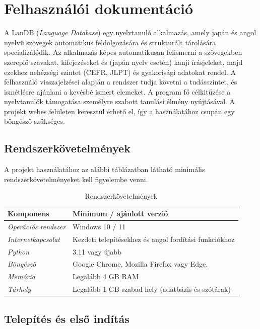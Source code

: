 \chapter{Felhasználói dokumentáció}
\label{ch:user}
A LanDB (\textit{Language Database}) egy nyelvtanuló alkalmazás, amely japán és angol nyelvű szövegek automatikus feldolgozására és strukturált tárolására specializálódik. Az alkalmazás képes automatikusan felismerni a szövegekben szereplő szavakat, kifejezéseket és (japán nyelv esetén) kanji írásjeleket, majd ezekhez nehézségi szintet (CEFR, JLPT) és gyakorisági adatokat rendel. A felhasználó visszajelzései alapján a rendszer tudja követni a tudásszintet, és ismétlésre ajánlani a kevésbé ismert elemeket. A program fő célkitűzése a nyelvtanulók támogatása személyre szabott tanulási élmény nyújtásával. A projekt webes felületen keresztül érhető el, így a használatához csupán egy böngésző szükséges.

\section{Rendszerkövetelmények}

A projekt használatához az alábbi táblázatban látható minimális rendszerkövetelményeket kell figyelembe venni.

\begin{table}[H]
	\centering
	\begin{tabular}{ | m{} | m{} | }
		\hline
		\textbf{Komponens} & \textbf{Minimum / ajánlott verzió} \\
		\hline \hline
		\emph{Operációs rendszer} & Windows 10 / 11 \\
		\hline
        \emph{Internetkapcsolat} & Kezdeti telepítésekhez és angol fordítási funkciókhoz\\
		\hline
		\emph{Python} &  3.11 vagy újabb \\
		\hline
		\emph{Böngésző} & Google Chrome, Mozilla Firefox vagy Edge. \\
		\hline
        \emph{Memória} & Legalább 4 GB RAM \\
		\hline
        \emph{Tárhely} & Legalább 1 GB szabad hely (adatbázis és szótárak) \\
		\hline
	\end{tabular}
	\caption{Rendszerkövetelmények}
	\label{tab:example-1}
\end{table}

\section{Telepítés és első indítás}


